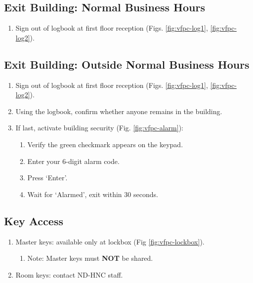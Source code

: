\documentclass[11pt]{article}
\begin{document}
\subsection{Exit Building: Normal Business Hours}
\label{ssec:exit-norm}

\begin{enumerate}
	\item Sign out of logbook at first floor reception (Figs. \ref{fig:vfpc-log1}, \ref{fig:vfpc-log2}).
\end{enumerate}


\subsection{Exit Building: Outside Normal Business Hours}
\label{ssec:exit-outnorm}

\begin{enumerate}
	\item Sign out of logbook at first floor reception (Figs. \ref{fig:vfpc-log1}, \ref{fig:vfpc-log2}).
	\item Using the logbook, confirm whether anyone remains in the building.
	\item If last, activate building security (Fig. \ref{fig:vfpc-alarm}):
	\begin{enumerate}
        \item Verify the green checkmark appears on the keypad.
        \item Enter your 6-digit alarm code.
        \item Press `Enter'.
        \item Wait for `Alarmed', exit within 30 seconds.
    \end{enumerate}
\end{enumerate}


\subsection{Key Access}
\label{ssec:keys}

\begin{enumerate}
	\item Master keys: available only at lockbox (Fig \ref{fig:vfpc-lockbox}).
	\begin{enumerate}
		\item Note: Master keys must \textbf{NOT} be shared.
	\end{enumerate}
	\item Room keys: contact ND-HNC staff.
\end{enumerate}
\end{document}

